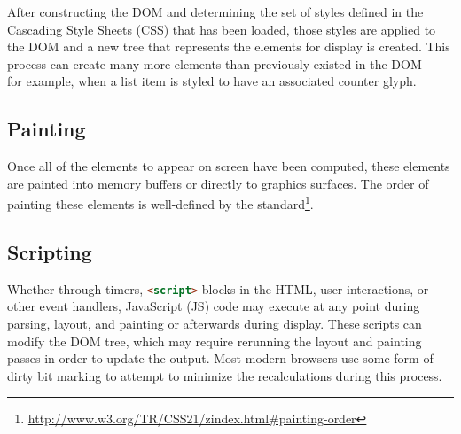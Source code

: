 After constructing the DOM and determining the set of styles defined in the Cascading Style Sheets (CSS) that has
been loaded, those styles are applied to the DOM and a new tree that represents the elements for display is
created.
This process can create many more elements than previously existed in the DOM --- for example, when a list item is
styled to have an associated counter glyph.

\subsection{Painting}

Once all of the elements to appear on screen have been computed, these elements are painted into memory buffers or
directly to graphics surfaces.
The order of painting these elements is well-defined by the standard\footnote{\url{http://www.w3.org/TR/CSS21/zindex.html#painting-order}}.

\subsection{Scripting}

Whether through timers, \lstinline[language=HTML]{<script>} blocks in the HTML, user interactions, or other event handlers,
JavaScript (JS) code may execute at any point during parsing, layout, and painting or afterwards during display.
These scripts can modify the DOM tree, which may require rerunning the layout and painting passes in order to update
the output.
Most modern browsers use some form of dirty bit marking to attempt to minimize the recalculations during this process.


